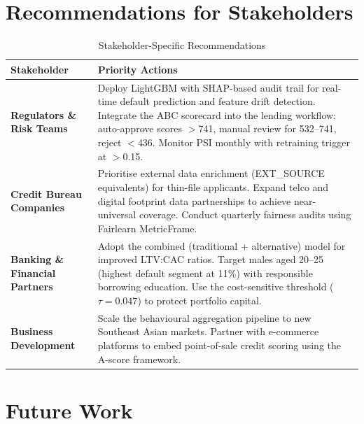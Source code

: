 \section{Recommendations for Stakeholders}
\label{sec:recommendations}

\begin{table}[H]
\centering
\caption{Stakeholder-Specific Recommendations}
\label{tab:recommendations}
\begin{tabular}{p{3.5cm}p{9.5cm}}
\toprule
\textbf{Stakeholder} & \textbf{Priority Actions} \\
\midrule
\textbf{Regulators \& Risk Teams} & Deploy LightGBM with SHAP-based audit trail for real-time default prediction and feature drift detection. Integrate the ABC scorecard into the lending workflow: auto-approve scores $>$741, manual review for 532--741, reject $<$436. Monitor PSI monthly with retraining trigger at $>$0.15. \\
\midrule
\textbf{Credit Bureau Companies} & Prioritise external data enrichment (EXT\_SOURCE equivalents) for thin-file applicants. Expand telco and digital footprint data partnerships to achieve near-universal coverage. Conduct quarterly fairness audits using Fairlearn MetricFrame. \\
\midrule
\textbf{Banking \& Financial Partners} & Adopt the combined (traditional + alternative) model for improved LTV:CAC ratios. Target males aged 20--25 (highest default segment at 11\%) with responsible borrowing education. Use the cost-sensitive threshold ($\tau = 0.047$) to protect portfolio capital. \\
\midrule
\textbf{Business Development} & Scale the behavioural aggregation pipeline to new Southeast Asian markets. Partner with e-commerce platforms to embed point-of-sale credit scoring using the A-score framework. \\
\bottomrule
\end{tabular}
\end{table}

\section{Future Work}
\label{sec:future_work}

